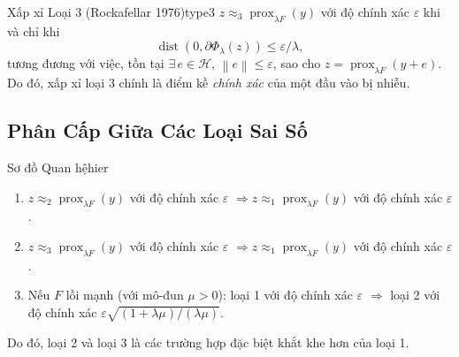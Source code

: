 \documentclass[12pt, a4paper]{article}
\newcommand{\HH}{\mathcal{H}}
\newcommand{\prox}{\operatorname{prox}}
\newcommand{\dist}{\operatorname{dist}}
\newcommand{\norm}[1]{\left\|#1\right\|}
\begin{document}
\begin{definition}{Xấp xỉ Loại 3 (Rockafellar 1976)}{type3}
$z\approx_3\prox_{\lambda F}(y)$ với độ chính xác $\varepsilon$ khi và chỉ khi
\[
  \dist(0,\partial\Phi_\lambda(z))\le\varepsilon/\lambda,
  \tag{AT3}
\]
tương đương với việc, tồn tại $\exists\,e\in\HH$, $\norm{e}\le\varepsilon$, sao cho
$z=\prox_{\lambda F}(y+e)$.
Do đó, xấp xỉ loại 3 chính là điểm kề \emph{chính xác} của một đầu vào bị nhiễu.
\end{definition}



\subsection{Phân Cấp Giữa Các Loại Sai Số}

\begin{proposition}{Sơ đồ Quan hệ}{hier}
\begin{enumerate}[label=(\roman*)]
  \item $z\approx_2\prox_{\lambda F}(y)$ với độ chính xác $\varepsilon$
        $\Rightarrow z\approx_1\prox_{\lambda F}(y)$ với độ chính xác $\varepsilon$.
  \item $z\approx_3\prox_{\lambda F}(y)$ với độ chính xác $\varepsilon$
        $\Rightarrow z\approx_1\prox_{\lambda F}(y)$ với độ chính xác $\varepsilon$.
  \item Nếu $F$ lồi mạnh (với mô-đun $\mu>0$):
        loại 1 với độ chính xác $\varepsilon$
        $\Rightarrow$ loại 2 với độ chính xác $\varepsilon\sqrt{(1+\lambda\mu)/(\lambda\mu)}$.
\end{enumerate}
Do đó, loại 2 và loại 3 là các trường hợp đặc biệt khắt khe hơn của loại 1.
\end{proposition}

\begin{center}
\end{center}
\end{document}
